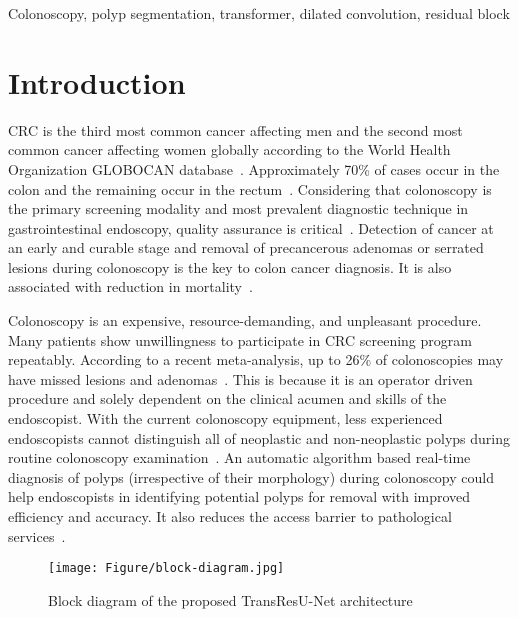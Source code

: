 \documentclass[conference]{IEEEtran}
\begin{document}
\begin{IEEEkeywords}
Colonoscopy, polyp segmentation, transformer, dilated convolution, residual block 
\end{IEEEkeywords}

\section{Introduction}
\ac{CRC} is the third most common cancer affecting men and the second most common cancer affecting women globally according to the World Health Organization GLOBOCAN database~\cite{sung2021global}. Approximately 70\% of cases occur in the colon and the remaining occur in the rectum~\cite{siegel2022cancer}. Considering that colonoscopy is the primary screening modality and most prevalent diagnostic technique in gastrointestinal endoscopy,  quality assurance is critical~\cite{seeff2004many}. Detection of cancer at an early and curable stage and removal of precancerous adenomas or serrated lesions during colonoscopy is the key to colon cancer diagnosis. It is also associated with reduction in mortality~\cite{kronborg1996randomised,zauber2012colonoscopic}. 

Colonoscopy is an expensive, resource-demanding, and unpleasant procedure. Many patients show unwillingness to participate in \ac{CRC} screening program repeatably. According to a recent meta-analysis, up to 26\% of colonoscopies may have missed lesions and adenomas~\cite{zhao2019magnitude}. This is because it is an operator driven procedure and solely dependent on the clinical acumen and skills of the endoscopist. With the current colonoscopy equipment, less experienced endoscopists cannot distinguish all of neoplastic and non-neoplastic polyps during routine colonoscopy examination~\cite{wadhwa2020physician,dayyeh2015asge}. An automatic algorithm based real-time diagnosis of polyps (irrespective of their morphology) during colonoscopy could help endoscopists in identifying potential polyps for removal with improved efficiency and accuracy. It also reduces the access barrier to pathological services~\cite{wilson2018access}.  

\begin{figure*}[t!]
    \centering
    \texttt{[image: Figure/block-diagram.jpg]}
    \caption{Block diagram of the proposed TransResU-Net architecture}
    \label{fig:proposed-architecture}
\end{figure*}
\end{document}
